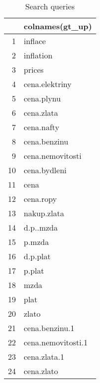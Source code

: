 \begin{table}[ht]
\centering
\begin{tabular}{rl}
  \hline
 & colnames(gt\_up) \\ 
  \hline
1 & inflace \\ 
  2 & inflation \\ 
  3 & prices \\ 
  4 & cena.elektriny \\ 
  5 & cena.plynu \\ 
  6 & cena.zlata \\ 
  7 & cena.nafty \\ 
  8 & cena.benzinu \\ 
  9 & cena.nemovitosti \\ 
  10 & cena.bydleni \\ 
  11 & cena \\ 
  12 & cena.ropy \\ 
  13 & nakup.zlata \\ 
  14 & d.p..mzda \\ 
  15 & p.mzda \\ 
  16 & d.p.plat \\ 
  17 & p.plat \\ 
  18 & mzda \\ 
  19 & plat \\ 
  20 & zlato \\ 
  21 & cena.benzinu.1 \\ 
  22 & cena.nemovitosti.1 \\ 
  23 & cena.zlata.1 \\ 
  24 & cena.zlato \\ 
   \hline
\end{tabular}
\caption{Search queries} 
\end{table}
